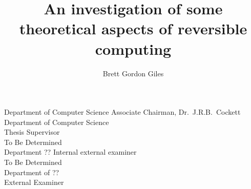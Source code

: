\documentclass{ucalgthes1}
\title{An investigation of some theoretical aspects of reversible computing \\
\bigskip  }
\author{Brett Gordon Giles}
\newcommand{\thesistitle}{An investigation of the theoretical aspects of reversible computing}
\begin{document}
\makethesistitle
{}     %
\setcounter{page}{1}

%
%
\begin{signing}{Department of Computer Science}
\signline
Associate Chairman, Dr.~J.R.B.~Cockett\\
Department of Computer Science \\
Thesis Supervisor\\
\signline
To Be Determined \\
Department ??
Internal external examiner  \\

\signline
To Be Determined \\
Department of ??  \\
External Examiner
\end{signing}
%
\newpage
{}
{}

\newpage
{}
{}


\begin{singlespace}
\newpage
{}
\tableofcontents
\pagestyle{plain}
\newpage
{}
\listoftables
\pagestyle{plain}
\newpage
{}
\listoffigures
\pagestyle{plain}
\clearpage
\clearpage          %
\end{singlespace}
\newpage
{}
\end{document}

